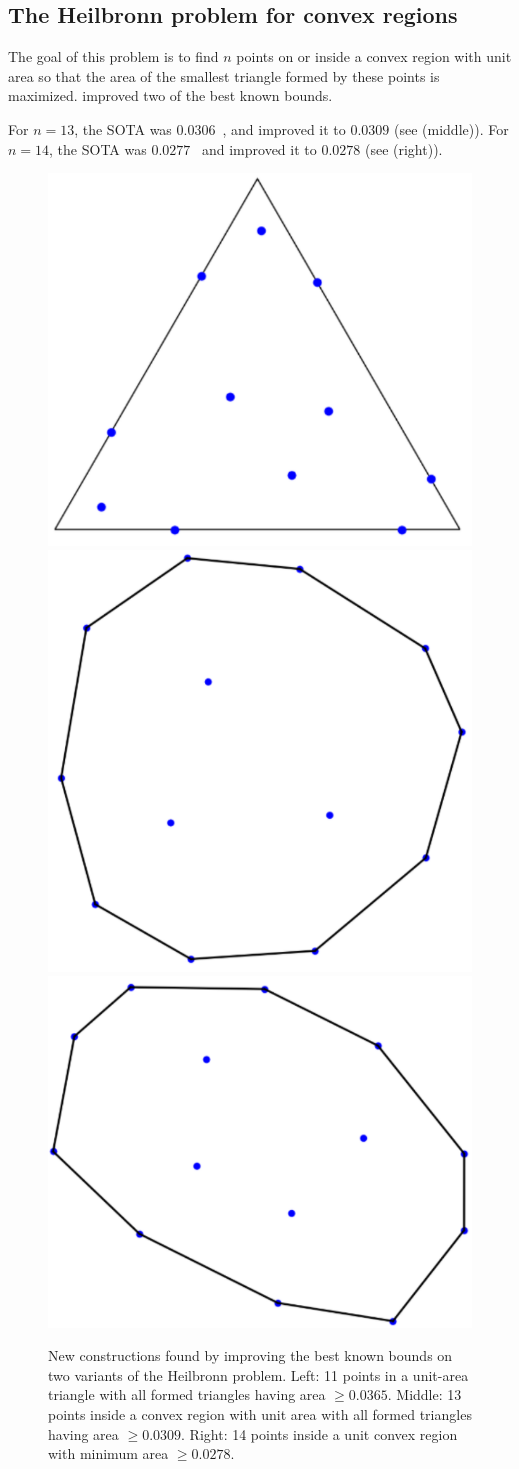 \subsection{The Heilbronn problem for convex regions}
The goal of this problem is to find $n$ points on or inside a convex region with unit area so that the area of the smallest triangle formed by these points is maximized. \method improved two of the best known bounds.

For $n=13$, the SOTA was $0.0306$~\citep{geometry_collection}, and \method improved it to $0.0309$ (see  (middle)).
For $n=14$, the SOTA was $0.0277$~\citep{geometry_collection} and \method improved it to $0.0278$ (see  (right)).

\begin{figure}
    \centering
    \includegraphics[width=0.25\linewidth]{figures/Heilbronn_triangle.pdf}
    \includegraphics[width=0.25\linewidth]{figures/Heilbronn_convex_1.pdf}
    \includegraphics[width=0.25\linewidth]{figures/Heilbronn_convex_2.pdf}
    \caption{New constructions found by \method improving the best known bounds on two variants of the Heilbronn problem. Left: 11 points in a unit-area triangle with all formed triangles having area $\geq 0.0365$. Middle: 13 points inside a convex region with unit area with all formed triangles having area $\geq 0.0309$. Right: 14 points inside a unit convex region with minimum area  $\ge 0.0278$.}
    \label{fig:heilbronn}
\end{figure}


